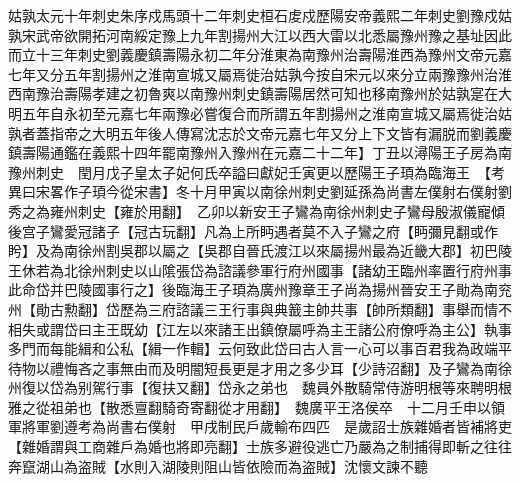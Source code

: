 姑孰太元十年刺史朱序戍馬頭十二年刺史桓石䖍戍歷陽安帝義熙二年刺史劉豫戍姑孰宋武帝欲開拓河南綏定豫上九年割揚州大江以西大雷以北悉屬豫州豫之基址因此而立十三年刺史劉義慶鎮壽陽永初二年分淮東為南豫州治壽陽淮西為豫州文帝元嘉七年又分五年割揚州之淮南宣城又屬焉徙治姑孰今按自宋元以來分立兩豫豫州治淮西南豫治壽陽孝建之初魯爽以南豫州刺史鎮壽陽居然可知也移南豫州於姑孰寔在大明五年自永初至元嘉七年兩豫必嘗復合而所謂五年割揚州之淮南宣城又屬焉徙治姑孰者蓋指帝之大明五年後人傳寫沈志於文帝元嘉七年又分上下文皆有漏脱而劉義慶鎮壽陽通鑑在義熙十四年罷南豫州入豫州在元嘉二十二年】丁丑以潯陽王子房為南豫州刺史　閏月戊子皇太子妃何氏卒謚曰獻妃壬寅更以歷陽王子頊為臨海王　【考異曰宋畧作子頊今從宋書】冬十月甲寅以南徐州刺史劉延孫為尚書左僕射右僕射劉秀之為雍州刺史【雍於用翻】　乙卯以新安王子鸞為南徐州刺史子鸞母殷淑儀寵傾後宫子鸞愛冠諸子【冠古玩翻】凡為上所眄遇者莫不入子鸞之府【眄彌見翻或作盻】及為南徐州割吳郡以屬之【吳郡自晉氏渡江以來屬揚州最為近畿大郡】初巴陵王休若為北徐州刺史以山隂張岱為諮議參軍行府州國事【諸幼王臨州率置行府州事此命岱并巴陵國事行之】後臨海王子頊為廣州豫章王子尚為揚州晉安王子勛為南兖州【勛古勲翻】岱歷為三府諮議三王行事與典籖主帥共事【帥所類翻】事舉而情不相失或謂岱曰主王既幼【江左以來諸王出鎮僚屬呼為主王諸公府僚呼為主公】執事多門而每能緝和公私【緝一作輯】云何致此岱曰古人言一心可以事百君我為政端平待物以禮悔吝之事無由而及明闇短長更是才用之多少耳【少詩沼翻】及子鸞為南徐州復以岱為别駕行事【復扶又翻】岱永之弟也　魏員外散騎常侍游明根等來聘明根雅之從祖弟也【散悉亶翻騎奇寄翻從才用翻】　魏廣平王洛侯卒　十二月壬申以領軍將軍劉遵考為尚書右僕射　甲戌制民戶歲輸布四匹　是歲詔士族雜婚者皆補將吏【雜婚謂與工商雜戶為婚也將即亮翻】士族多避役逃亡乃嚴為之制捕得即斬之往往奔竄湖山為盗賊【水則入湖陵則阻山皆依險而為盗賊】沈懷文諫不聽

